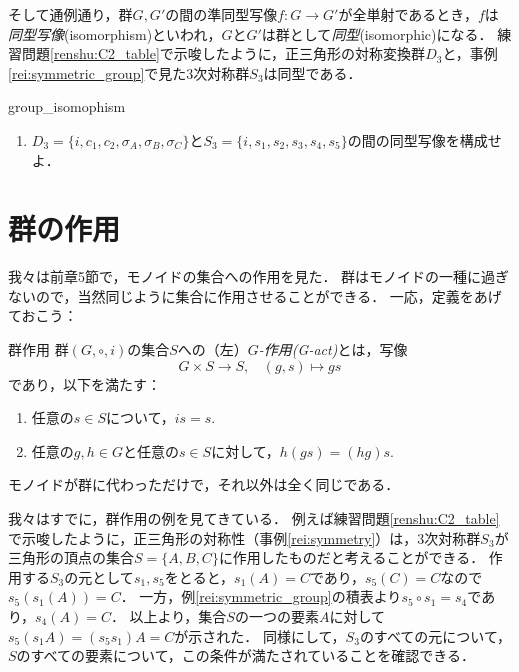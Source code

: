 \documentclass[11pt,a4paper]{jsarticle}
\begin{document}
そして通例通り，群$G, G'$の間の準同型写像$f:G \to G'$が全単射であるとき，$f$は\emph{同型写像}(isomorphism)といわれ，$G$と$G'$は群として\emph{同型}(isomorphic)になる．
練習問題\ref{renshu:C2_table}で示唆したように，正三角形の対称変換群$D_3$と，事例\ref{rei:symmetric_group}で見た3次対称群$S_3$は同型である．

\begin{renshu}{}{group_isomophism}
    \begin{enumerate}
        \item $D_3 = \{i, c_1, c_2, \sigma_A, \sigma_B, \sigma_C\}$と$S_3 = \{i, s_1, s_2, s_3, s_4, s_5\}$の間の同型写像を構成せよ．
    \end{enumerate}
    
\end{renshu}

\section{群の作用}
我々は前章5節で，モノイドの集合への作用を見た．
群はモノイドの一種に過ぎないので，当然同じように集合に作用させることができる．
一応，定義をあげておこう：
\begin{dfn}{群作用}{}
    群$(G, \circ, i)$の集合$S$への（左）\emph{$G$-作用(G-act)}とは，写像
    \[
     G \times S \to S, \ \ \ \ (g, s) \mapsto gs
    \]
    であり，以下を満たす：
    \begin{enumerate}
     \item 任意の$s \in S$について，$is = s$.
     \item 任意の$g, h \in G$と任意の$s \in S$に対して，$h(gs) = (hg)s$.
    \end{enumerate}
\end{dfn}
モノイドが群に代わっただけで，それ以外は全く同じである．

我々はすでに，群作用の例を見てきている．
例えば練習問題\ref{renshu:C2_table}で示唆したように，正三角形の対称性（事例\ref{rei:symmetry}）は，3次対称群$S_3$が三角形の頂点の集合$S = \{A, B, C\}$に作用したものだと考えることができる．
作用する$S_3$の元として$s_1, s_5$をとると，$s_1(A)=C$であり，$s_5(C)=C$なので$s_5 (s_1 (A)) = C$．
一方，例\ref{rei:symmetric_group}の積表より$s_5 \circ s_1 = s_4$であり，$s_4(A)=C$．
以上より，集合$S$の一つの要素$A$に対して$s_5(s_1 A) = (s_5 s_1)A = C$が示された．
同様にして，$S_3$のすべての元について，$S$のすべての要素について，この条件が満たされていることを確認できる．
\end{document}
